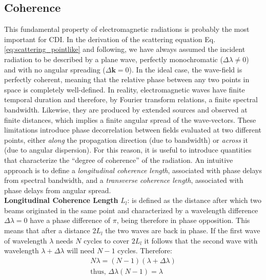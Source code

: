 \subsection{Coherence}

This fundamental property of electromagnetic radiations is probably the most important for CDI. In the derivation of the 
scattering equation Eq.\ref{eq:scattering_pointlike} and following, we have always assumed the incident radiation to be 
described by a plane wave, perfectly monochromatic ($\Delta \lambda \neq 0 $) and with no angular spreading ($\Delta \mathbf{k} = 0$). 
In the ideal case, the wave-field is perfectly coherent, meaning that the relative phase between any two points in space is 
completely well-defined.
In reality, electromagnetic waves have finite temporal duration and therefore, by Fourier transform relations, a finite 
spectral bandwidth. Likewise, they are produced by extended sources and observed at finite distances, which implies a 
finite angular spread of the wave-vectors.
These limitations introduce phase decorrelation between fields evaluated at two different points, either \textit{along} the propagation 
direction (due to bandwidth) or \textit{across} it (due to angular dispersion).
For this reason, it is useful to introduce quantities that characterize the ``degree of coherence'' of the radiation. 
An intuitive approach is to define a \textit{longitudinal coherence length}, associated with phase delays from spectral 
bandwidth, and a \textit{transverse coherence length}, associated with phase delays from angular spread. \\

\textbf{Longitudinal Coherence Length} $L_l$: is defined as the distance after which two beams originated in the same point and 
characterized by a wavelength difference $\Delta \lambda = 0 $ have a phase difference of $\pi$, being therefore in phase opposition. 
This means that after a distance $2L_l$ the two waves are back in phase. If the first wave of wavelength $\lambda$ needs 
$N$ cycles to cover $2L_l$ it follows that the second wave with wavelength $\lambda + \Delta \lambda$ will need $N-1$ cycles. 
Therefore: 
\begin{equation}
    \begin{aligned}
    N\lambda = (N-1)(\lambda + \Delta \lambda) \\
    \text{thus, } \Delta \lambda(N-1) = \lambda 
    \end{aligned}
\end{equation}

